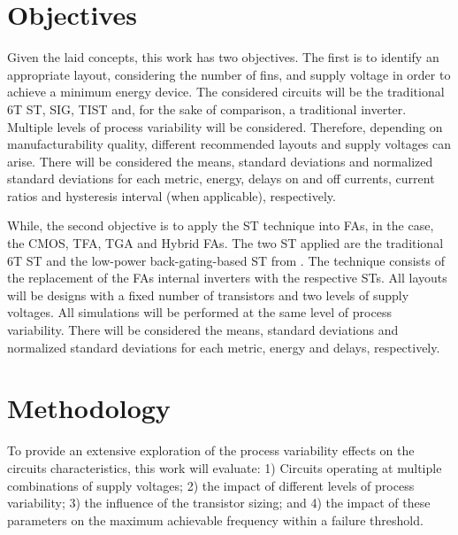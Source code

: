 \documentclass[pgmicro,mestrado,english]{iiufrgs}
\begin{document}
\chapter{Objectives}

Given the laid concepts, this work has two objectives. The first is to identify an appropriate layout, considering the number of fins, and supply voltage in order to achieve a minimum energy device. The considered circuits will be the traditional 6T ST, SIG, TIST and, for the sake of comparison, a traditional inverter. Multiple levels of process variability will be considered. Therefore, depending on manufacturability quality, different recommended layouts and supply voltages can arise. There will be considered the means, standard deviations and normalized standard deviations for each metric, energy, delays on and off currents, current ratios and hysteresis interval (when applicable), respectively.

While, the second objective is to apply the ST technique into FAs, in the case, the CMOS, TFA, TGA and Hybrid FAs. The two ST applied are the traditional 6T ST and the low-power back-gating-based ST from \cite{zhang2003low}. The technique consists of the replacement of the FAs internal inverters with the respective STs. All layouts will be designs with a fixed number of transistors and two levels of supply voltages. All simulations will be performed at the same level of process variability. There will be considered the means, standard deviations and normalized standard deviations for each metric, energy and delays, respectively.

\chapter{Methodology}

To provide an extensive exploration of the process variability effects on the circuits characteristics, this work will evaluate: 1) Circuits operating at multiple combinations of supply voltages; 2) the impact of different levels of process variability; 3) the influence of the transistor sizing; and 4) the impact of these parameters on the maximum achievable frequency within a failure threshold.
\end{document}
